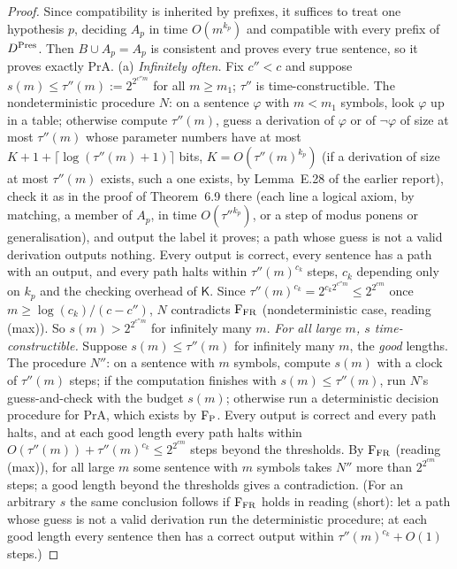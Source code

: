 \begin{proof}
Since compatibility is inherited by prefixes, it suffices to treat one hypothesis $p$, deciding $A_p$ in time $O(m^{k_p})$ and compatible with every prefix of $D^{\rm Pres}$. Then $B\cup A_p=A_p$ is consistent and proves every true sentence, so it proves exactly $\mathrm{PrA}$.
(a) \emph{Infinitely often.} Fix $c''<c$ and suppose $s(m)\le\tau''(m):=2^{2^{c''m}}$ for all $m\ge m_1$; $\tau''$ is time-constructible. The nondeterministic procedure $N$: on a sentence $\varphi$ with $m<m_1$ symbols, look $\varphi$ up in a table; otherwise compute $\tau''(m)$, guess a derivation of $\varphi$ or of $\neg\varphi$ of size at most $\tau''(m)$ whose parameter numbers have at most $K+1+\lceil\log(\tau''(m)+1)\rceil$ bits, $K=O(\tau''(m)^{k_p})$ (if a derivation of size at most $\tau''(m)$ exists, such a one exists, by Lemma~E.28 of the earlier report), check it as in the proof of Theorem~6.9 there (each line a logical axiom, by matching, a member of $A_p$, in time $O(\tau''^{k_p})$, or a step of modus ponens or generalisation), and output the label it proves; a path whose guess is not a valid derivation outputs nothing. Every output is correct, every sentence has a path with an output, and every path halts within $\tau''(m)^{c_k}$ steps, $c_k$ depending only on $k_p$ and the checking overhead of $\mathsf K$. Since $\tau''(m)^{c_k}=2^{c_k2^{c''m}}\le2^{2^{cm}}$ once $m\ge\log(c_k)/(c-c'')$, $N$ contradicts $\mathrm F_{\rm FR}$ (nondeterministic case, reading (max)). So $s(m)>2^{2^{c''m}}$ for infinitely many $m$.
\emph{For all large $m$, $s$ time-constructible.} Suppose $s(m)\le\tau''(m)$ for infinitely many $m$, the \emph{good} lengths. The procedure $N''$: on a sentence with $m$ symbols, compute $s(m)$ with a clock of $\tau''(m)$ steps; if the computation finishes with $s(m)\le\tau''(m)$, run $N$'s guess-and-check with the budget $s(m)$; otherwise run a deterministic decision procedure for $\mathrm{PrA}$, which exists by $\mathrm F_{\rm P}$. Every output is correct and every path halts, and at each good length every path halts within $O(\tau''(m))+\tau''(m)^{c_k}\le2^{2^{cm}}$ steps beyond the thresholds. By $\mathrm F_{\rm FR}$ (reading (max)), for all large $m$ some sentence with $m$ symbols takes $N''$ more than $2^{2^{cm}}$ steps; a good length beyond the thresholds gives a contradiction. (For an arbitrary $s$ the same conclusion follows if $\mathrm F_{\rm FR}$ holds in reading (short): let a path whose guess is not a valid derivation run the deterministic procedure; at each good length every sentence then has a correct output within $\tau''(m)^{c_k}+O(1)$ steps.)

\end{proof}
